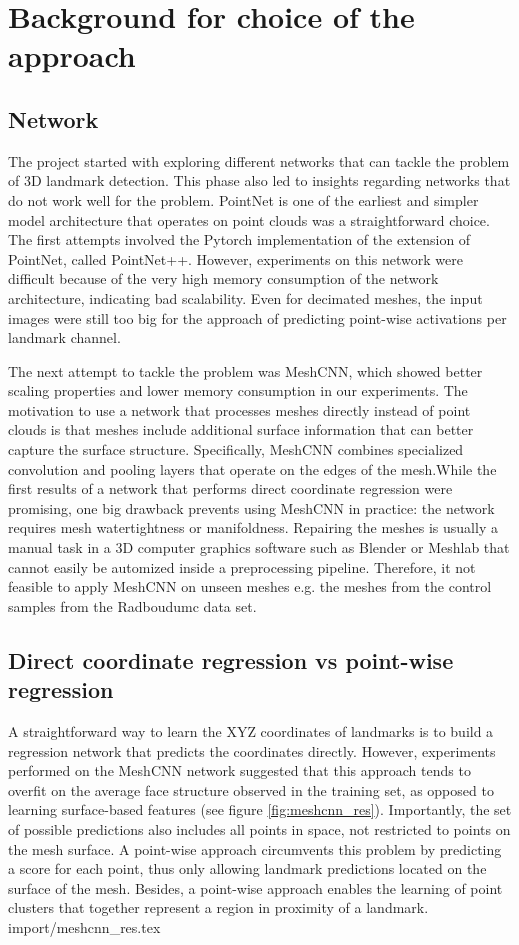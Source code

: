 \documentclass[class=article, crop=false]{standalone}
\begin{document}
\section{Background for choice of the approach}
\label{sec:app_approach_choice}
\subsection{Network}
The project started with exploring different networks that can tackle the problem of 3D landmark detection. This phase also led to insights regarding networks that do not work well for the problem. PointNet is one of the earliest and simpler model architecture that operates on point clouds was a straightforward choice. The first attempts involved the Pytorch implementation of the extension of PointNet, called PointNet++. However, experiments on this network were difficult because of the very high memory consumption of the network architecture, indicating bad scalability. Even for decimated meshes, the input images were still too big for the approach of predicting point-wise activations per landmark channel.

The next attempt to tackle the problem was MeshCNN, which showed better scaling properties and lower memory consumption in our experiments. The motivation to use a network that processes meshes directly instead of point clouds is that meshes include additional surface information that can better capture the surface structure. Specifically, MeshCNN combines specialized convolution and pooling layers that operate on the edges of the mesh.While the first results of a network that performs direct coordinate regression were promising, one big drawback prevents using MeshCNN in practice: the network requires mesh watertightness or manifoldness. Repairing the meshes is usually a manual task in a 3D computer graphics software such as Blender \cite{blender} or Meshlab \cite{meshlab} that cannot easily be automized inside a preprocessing pipeline. Therefore, it not feasible to apply MeshCNN on unseen meshes e.g. the meshes from the control samples from the Radboudumc data set.

\subsection{Direct coordinate regression vs point-wise regression}
\label{sec:coord_reg_vs_pw_reg}
A straightforward way to learn the XYZ coordinates of landmarks is to build a regression network that predicts the coordinates directly. However, experiments performed on the MeshCNN network suggested that this approach tends to overfit on the average face structure observed in the training set, as opposed to learning surface-based features (see figure \ref{fig:meshcnn_res}). Importantly, the set of possible predictions also includes all points in space, not restricted to points on the mesh surface. A point-wise approach circumvents this problem by predicting a score for each point, thus only allowing landmark predictions located on the surface of the mesh. Besides, a point-wise approach enables the learning of point clusters that together represent a region in proximity of a landmark.
{import/meshcnn_res.tex}


\end{document}
